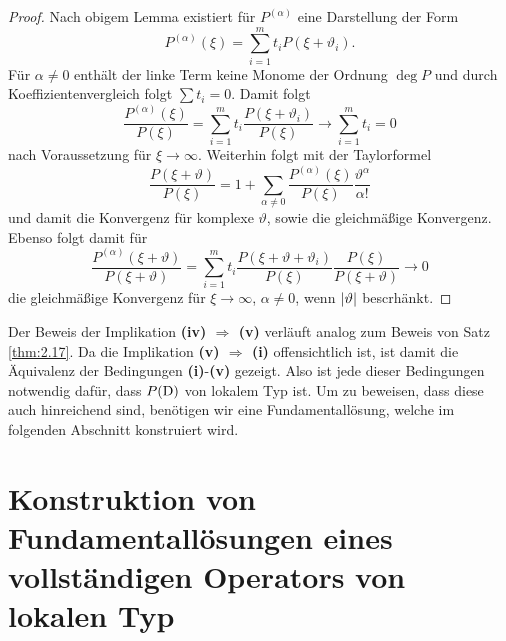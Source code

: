 \begin{proof}
Nach obigem Lemma existiert für $P^{(\alpha)}$ eine Darstellung der Form
\begin{equation}
P^{(\alpha)}(\xi)=\sum_{i=1}^m t_i P(\xi+\vartheta_i).
\end{equation}
Für $\alpha\neq0$ enthält der linke Term keine Monome der Ordnung $\deg P$ und durch Koeffizientenvergleich folgt $\sum t_i=0$. Damit folgt
\begin{equation}
\dfrac{P^{(\alpha)}(\xi)}{P(\xi)}=\sum_{i=1}^m t_i\dfrac{P(\xi+\vartheta_i)}{P(\xi)} \rightarrow \sum_{i=1}^m t_i=0
\end{equation}
nach Voraussetzung für $\xi\to\infty$. Weiterhin folgt mit der Taylorformel
\begin{equation}
\dfrac{P(\xi+\vartheta)}{P(\xi)}=1+\sum_{\alpha\neq 0} \dfrac{P^{(\alpha)}(\xi)}{P(\xi)}\dfrac{\vartheta^\alpha}{\alpha!}
\end{equation}
und damit die Konvergenz für komplexe $\vartheta$, sowie die gleichmäßige Konvergenz. Ebenso folgt damit für
\begin{equation}
\dfrac{P^{(\alpha)}(\xi+\vartheta)}{P(\xi+\vartheta)}=\sum_{i=1}^mt_i\dfrac{P(\xi+\vartheta+\vartheta_i)}{P(\xi)}\dfrac{P(\xi)}{P(\xi+\vartheta)} \rightarrow 0
\end{equation}
die gleichmäßige Konvergenz für $\xi\to\infty$, $\alpha\neq0$, wenn $\lvert\vartheta\rvert$ bescrhänkt.
\end{proof}
Der Beweis der Implikation {\bf (iv) $\Rightarrow$ (v)} verläuft analog zum Beweis von Satz \ref{thm:2.17}. Da die Implikation {\bf (v) $\Rightarrow$ (i)} offensichtlich ist, ist damit die Äquivalenz der Bedingungen {\bf (i)}-{\bf(v)} gezeigt. Also ist jede dieser Bedingungen notwendig dafür, dass $P(\mathrm D)$ von lokalem Typ ist. Um zu beweisen, dass diese auch hinreichend sind, benötigen wir eine Fundamentallösung, welche im folgenden Abschnitt konstruiert wird.

\section{Konstruktion von Fundamentallösungen eines vollständigen Operators von lokalen Typ} %

